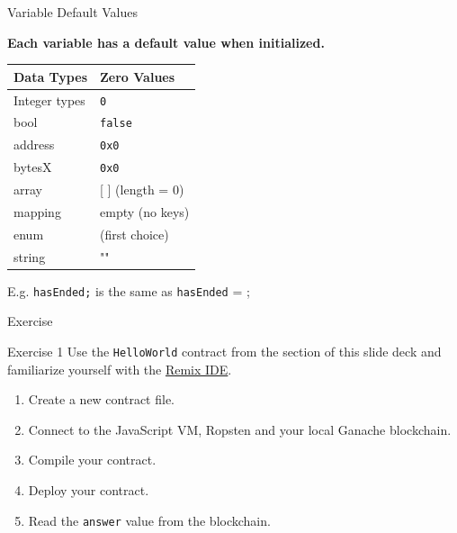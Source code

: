 \documentclass[handout]{beamer}
\begin{document}
\begin{frame}{Variable Default Values}

\textbf{Each variable has a default value when initialized.} \\

	\begin{table}
		\begin{tabular}{m{4cm} m{4cm}}
		\rowcolor{highlight}
			\hline
			Data Types & Zero Values\\
			\hline 
			\rowcolor{brightanthracite}
			Integer types & \texttt{0} \\
			bool &  \texttt{false} \\
			\rowcolor{brightanthracite}
			address & \texttt{0x0} \\
			bytesX & \texttt{0x0} \\
			\rowcolor{brightanthracite}
			array & [ ] (length = 0) \\
			mapping & empty (no keys) \\
			\rowcolor{brightanthracite}
			enum & (first choice) \\
			string & "" \\
			\hline
		\end{tabular}
	\end{table}	
	
	E.g. \texttt{hasEnded;} is the same as \texttt{hasEnded} = ;
	
\end{frame}

\begin{frame}{Exercise}
	\begin{exercise}{Exercise 1}
	Use the \texttt{HelloWorld} contract from the  section of this slide deck and familiarize yourself with the \link \href{https://remix.ethereum.org}{Remix IDE}.
	\vspace{0.3em}
	\begin{enumerate}
		\item Create a new contract file.
		\item Connect to the JavaScript VM, Ropsten and your local Ganache blockchain.
		\item Compile your contract.
		\item Deploy your contract.
		\item Read the \texttt{answer}  value from the blockchain.
	\end{enumerate}  
	\end{exercise}
\end{frame}
\end{document}

